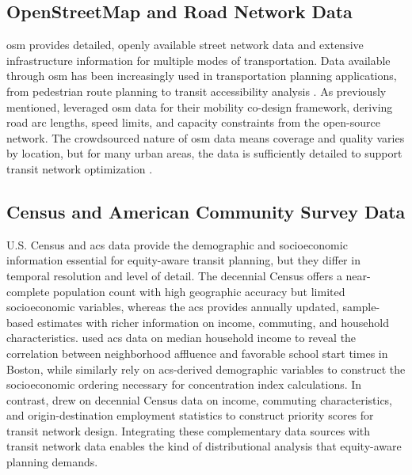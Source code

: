 \subsection{OpenStreetMap and Road Network Data}

\Gls{osm} provides detailed, openly available street network data and extensive infrastructure information for multiple modes of transportation. Data available through \gls{osm} has been increasingly used in transportation planning applications, from pedestrian route planning to transit accessibility analysis \cite{openstreetmapwikicontributors2026Routing, liuGeneralizedFrameworkMeasuring2022}. As previously mentioned, \textcite{zardiniCoDesignEnableUserFriendly2023} leveraged \gls{osm} data for their mobility co-design framework, deriving road arc lengths, speed limits, and capacity constraints from the open-source network. The crowdsourced nature of \gls{osm} data means coverage and quality varies by location, but for many urban areas, the data is sufficiently detailed to support transit network optimization \cite{2024Complexity}. 

\subsection{Census and American Community Survey Data}

U.S. Census and \gls{acs} data provide the demographic and socioeconomic information essential for equity-aware transit planning, but they differ in temporal resolution and level of detail. The decennial Census offers a near-complete population count with high geographic accuracy but limited socioeconomic variables, whereas the \gls{acs} provides annually updated, sample-based estimates with richer information on income, commuting, and household characteristics. \textcite{bertsimasOptimizingSchoolsStart2019} used \gls{acs} data on median household income to reveal the correlation between neighborhood affluence and favorable school start times in Boston, while \textcite{karnerAdvancesPitfallsMeasuring2025} similarly rely on \gls{acs}-derived demographic variables to construct the socioeconomic ordering necessary for concentration index calculations. In contrast, \textcite{paviaDesigningEquitableTransit2023} drew on decennial Census data on income, commuting characteristics, and origin-destination employment statistics to construct priority scores for transit network design. Integrating these complementary data sources with transit network data enables the kind of distributional analysis that equity-aware planning demands.

